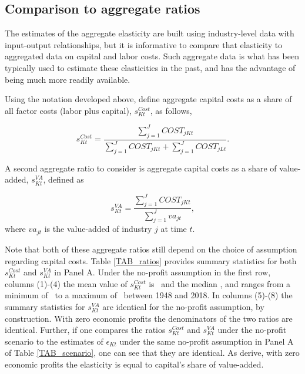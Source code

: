 \documentclass[11pt]{article}
\begin{document}
\subsection{Comparison to aggregate ratios}
The estimates of the aggregate elasticity are built using industry-level data with input-output relationships, but it is informative to compare that elasticity to aggregated data on capital and labor costs. Such aggregate data is what has been typically used to estimate these elasticities in the past, and has the advantage of being much more readily available.

Using the notation developed above, define aggregate capital costs as a share of all factor costs (labor plus capital), $s^{Cost}_{Kt}$, as follows,

\begin{equation}
	s^{Cost}_{Kt} = \frac{\sum_{j=1}^{J} COST_{jKt}}{\sum_{j=1}^{J} COST_{jKt} + \sum_{j=1}^{J} COST_{jLt}}. \label{EQ_scost}
\end{equation}

A second aggregate ratio to consider is aggregate capital costs as a share of value-added, $s^{VA}_{Kt}$, defined as

\begin{equation}
	s^{VA}_{Kt} = \frac{\sum_{j=1}^{J} COST_{jKt}}{\sum_{j=1}^{J} va_{jt}}, \label{EQ_sva}
\end{equation}
where $va_{jt}$ is the value-added of industry $j$ at time $t$.

Note that both of these aggregate ratios still depend on the choice of assumption regarding capital costs. Table \ref{TAB_ratios} provides summary statistics for both $s^{Cost}_{Kt}$ and $s^{VA}_{Kt}$ in Panel A. Under the no-profit assumption in the first row, columns (1)-(4) the mean value of $s^{Cost}_{Kt}$ is \basemeannoprofit \ and the median \basemednoprofit, and ranges from a minimum of \baseminnoprofit \ to a maximum of \basemaxnoprofit \ between 1948 and 2018. In columns (5)-(8) the summary statistics for $s^{VA}_{Kt}$ are identical for the no-profit assumption, by construction. With zero economic profits the denominators of the two ratios are identical. Further, if one compares the ratios $s^{Cost}_{Kt}$ and $s^{VA}_{Kt}$ under the no-profit scenario to the estimates of $\epsilon_{Kt}$ under the same no-profit assumption in Panel A of Table \ref{TAB_scenario}, one can see that they are identical. As \cite{bfshortnote,bfprodge} derive, with zero economic profits the elasticity is equal to capital's share of value-added. 
\end{document}
